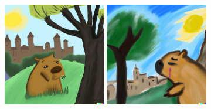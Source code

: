 \documentclass{article}
\newcommand{\imagewidthfactor}{0.4}
\begin{document}
\begin{figure}[h!]
\vspace{1.1em}
\includegraphics[width=\imagewidthfactor\textwidth]{media/2c.png}
\quad
\includegraphics[width=\imagewidthfactor\textwidth]{media/2d.png}
\end{figure}
\end{document}
